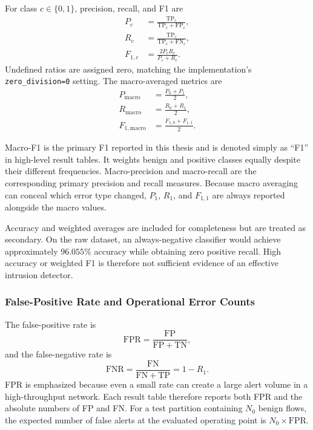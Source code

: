 For class $c\in\{0,1\}$, precision, recall, and F1 are
\begin{align}
    P_c &= \frac{\mathrm{TP}_c}
    {\mathrm{TP}_c+\mathrm{FP}_c}, \\
    R_c &= \frac{\mathrm{TP}_c}
    {\mathrm{TP}_c+\mathrm{FN}_c}, \\
    F_{1,c} &= \frac{2P_cR_c}{P_c+R_c}.
    \label{eq:classwise_metrics}
\end{align}
Undefined ratios are assigned zero, matching the implementation's
\texttt{zero\_division=0} setting. The macro-averaged metrics are
\begin{align}
    P_{\mathrm{macro}} &= \frac{P_0+P_1}{2}, \\
    R_{\mathrm{macro}} &= \frac{R_0+R_1}{2}, \\
    F_{1,\mathrm{macro}} &= \frac{F_{1,0}+F_{1,1}}{2}.
    \label{eq:experimental_macro_metrics}
\end{align}

Macro-F1 is the primary F1 reported in this thesis and is denoted simply as
``F1'' in high-level result tables. It weights benign and positive classes
equally despite their different frequencies. Macro-precision and macro-recall
are the corresponding primary precision and recall measures. Because macro
averaging can conceal which error type changed, $P_1$, $R_1$, and $F_{1,1}$
are always reported alongside the macro values.

Accuracy and weighted averages are included for completeness but are treated
as secondary. On the raw dataset, an always-negative classifier would achieve
approximately $96.055\%$ accuracy while obtaining zero positive recall. High
accuracy or weighted F1 is therefore not sufficient evidence of an effective
intrusion detector.

\subsubsection{False-Positive Rate and Operational Error Counts}
\label{subsubsec:fpr_metric}

The false-positive rate is
\begin{equation}
    \mathrm{FPR}=\frac{\mathrm{FP}}{\mathrm{FP}+\mathrm{TN}},
    \label{eq:false_positive_rate}
\end{equation}
and the false-negative rate is
\begin{equation}
    \mathrm{FNR}=\frac{\mathrm{FN}}{\mathrm{FN}+\mathrm{TP}}
    =1-R_1.
    \label{eq:false_negative_rate}
\end{equation}
FPR is emphasized because even a small rate can create a large alert volume in
a high-throughput network. Each result table therefore reports both FPR and the
absolute numbers of FP and FN. For a test partition containing $N_0$ benign
flows, the expected number of false alerts at the evaluated operating point is
$N_0\times\mathrm{FPR}$.

